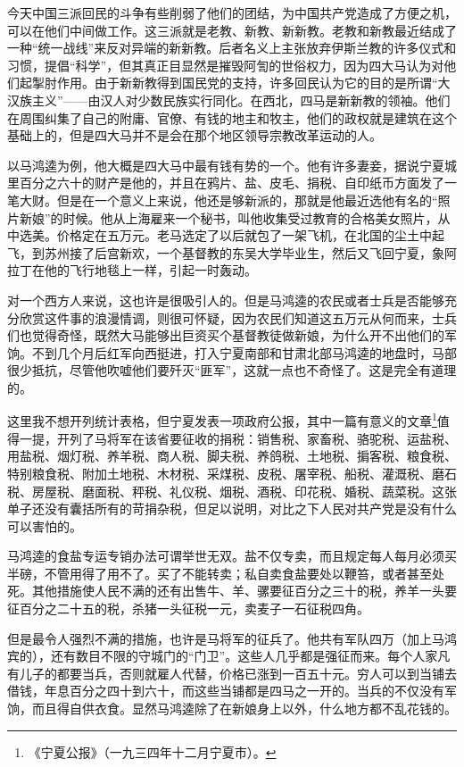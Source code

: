 \documentclass[10pt]{book}
\begin{document}
今天中国三派回民的斗争有些削弱了他们的团结，为中国共产党造成了方便之机，可以在他们中间做工作。这三派就是老教、新教、新新教。老教和新教最近结成了一种“统一战线”来反对异端的新新教。后者名义上主张放弃伊斯兰教的许多仪式和习惯，提倡“科学”，但其真正目显然是摧毁阿訇的世俗权力，因为四大马认为对他们起掣肘作用。由于新新教得到国民党的支持，许多回民认为它的目的是所谓“大汉族主义”——由汉人对少数民族实行同化。在西北，四马是新新教的领袖。他们在周围纠集了自己的附庸、官僚、有钱的地主和牧主，他们的政权就是建筑在这个基础上的，但是四大马并不是会在那个地区领导宗教改革运动的人。

以马鸿逵为例，他大概是四大马中最有钱有势的一个。他有许多妻妾，据说宁夏城里百分之六十的财产是他的，并且在鸦片、盐、皮毛、捐税、自印纸币方面发了一笔大财。但是在一个意义上来说，他还是够新派的，那就是他最近选他有名的“照片新娘”的时候。他从上海雇来一个秘书，叫他收集受过教育的合格美女照片，从中选美。价格定在五万元。老马选定了以后就包了一架飞机，在北国的尘土中起飞，到苏州接了后宫新欢，一个基督教的东吴大学毕业生，然后又飞回宁夏，象阿拉丁在他的飞行地毯上一样，引起一时轰动。

对一个西方人来说，这也许是很吸引人的。但是马鸿逵的农民或者士兵是否能够充分欣赏这件事的浪漫情调，则很可怀疑，因为农民们知道这五万元从何而来，士兵们也觉得奇怪，既然大马能够出巨资买个基督教徒做新娘，为什么开不出他们的军饷。不到几个月后红军向西挺进，打入宁夏南部和甘肃北部马鸿逵的地盘时，马部很少抵抗，尽管他吹嘘他们要歼灭“匪军”，这就一点也不奇怪了。这是完全有道理的。

这里我不想开列统计表格，但宁夏发表一项政府公报，其中一篇有意义的文章\footnote{《宁夏公报》（一九三四年十二月宁夏市）。}值得一提，开列了马将军在该省要征收的捐税：销售税、家畜税、骆驼税、运盐税、用盐税、烟灯税、养羊税、商人税、脚夫税、养鸽税、土地税、掮客税、粮食税、特别粮食税、附加土地税、木材税、采煤税、皮税、屠宰税、船税、灌溉税、磨石税、房屋税、磨面税、秤税、礼仪税、烟税、酒税、印花税、婚税、蔬菜税。这张单子还没有囊括所有的苛捐杂税，但足以说明，对比之下人民对共产党是没有什么可以害怕的。

马鸿逵的食盐专运专销办法可谓举世无双。盐不仅专卖，而且规定每人每月必须买半磅，不管用得了用不了。买了不能转卖；私自卖食盐要处以鞭笞，或者甚至处死。其他措施使人民不满的还有出售牛、羊、骡要征百分之三十的税，养羊一头要征百分之二十五的税，杀猪一头征税一元，卖麦子一石征税四角。

但是最令人强烈不满的措施，也许是马将军的征兵了。他共有军队四万（加上马鸿宾的），还有数目不限的守城门的“门卫”。这些人几乎都是强征而来。每个人家凡有儿子的都要当兵，否则就雇人代替，价格已涨到一百五十元。穷人可以到当铺去借钱，年息百分之四十到六十，而这些当铺都是四马之一开的。当兵的不仅没有军饷，而且得自供衣食。显然马鸿逵除了在新娘身上以外，什么地方都不乱花钱的。
\end{document}
